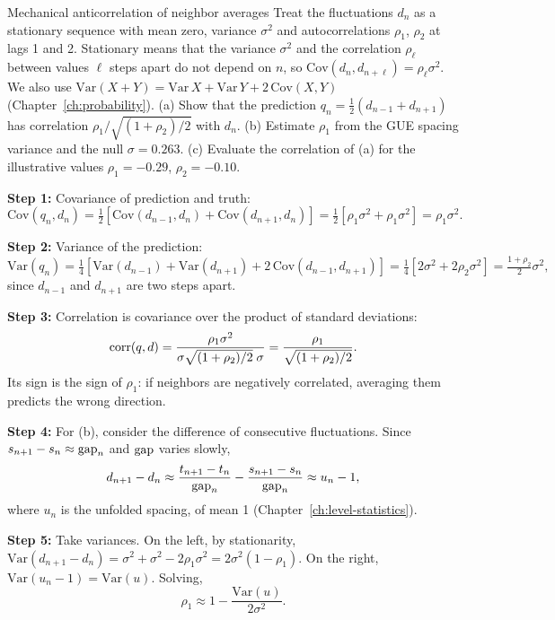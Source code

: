 \begin{sample}{Mechanical anticorrelation of neighbor averages}
Treat the fluctuations $d_n$ as a stationary sequence with mean zero, variance $\sigma^2$ and autocorrelations $\rho_1$, $\rho_2$ at lags 1 and 2. Stationary means that the variance $\sigma^2$ and the correlation $\rho_\ell$ between values $\ell$ steps apart do not depend on $n$, so $\mathrm{Cov}(d_n,d_{n+\ell})=\rho_\ell\sigma^2$. We also use $\mathrm{Var}(X+Y)=\mathrm{Var}\,X+\mathrm{Var}\,Y+2\,\mathrm{Cov}(X,Y)$ (Chapter~\ref{ch:probability}). (a) Show that the prediction $q_n=\tfrac12(d_{n-1}+d_{n+1})$ has correlation $\rho_1/\sqrt{(1+\rho_2)/2}$ with $d_n$. (b) Estimate $\rho_1$ from the GUE spacing variance and the null $\sigma=0.263$. (c) Evaluate the correlation of (a) for the illustrative values $\rho_1=-0.29$, $\rho_2=-0.10$.

\textbf{Step 1:} Covariance of prediction and truth:
\[
\mathrm{Cov}(q_n,d_n)=\tfrac12\left[\mathrm{Cov}(d_{n-1},d_n)+\mathrm{Cov}(d_{n+1},d_n)\right]=\tfrac12[\rho_1\sigma^2+\rho_1\sigma^2]=\rho_1\sigma^2 .
\]

\textbf{Step 2:} Variance of the prediction:
\[
\mathrm{Var}(q_n)=\tfrac14\left[\mathrm{Var}(d_{n-1})+\mathrm{Var}(d_{n+1})+2\,\mathrm{Cov}(d_{n-1},d_{n+1})\right]=\tfrac14[2\sigma^2+2\rho_2\sigma^2]=\tfrac{1+\rho_2}{2}\sigma^2,
\]
since $d_{n-1}$ and $d_{n+1}$ are two steps apart.

\textbf{Step 3:} Correlation is covariance over the product of standard deviations:
\begin{equation}
\mathrm{corr}(q,d)=\frac{\rho_1\sigma^2}{\sigma\sqrt{(1+\rho_2)/2}\;\sigma}=\frac{\rho_1}{\sqrt{(1+\rho_2)/2}} .
\label{eq:paper-memorization-nbrcorr}
\end{equation}
Its sign is the sign of $\rho_1$: if neighbors are negatively correlated, averaging them predicts the wrong direction.

\textbf{Step 4:} For (b), consider the difference of consecutive fluctuations. Since $s_{n+1}-s_n\approx\mathrm{gap}_n$ and $\mathrm{gap}$ varies slowly,
\[
d_{n+1}-d_n\approx\frac{t_{n+1}-t_n}{\mathrm{gap}_n}-\frac{s_{n+1}-s_n}{\mathrm{gap}_n}\approx u_n-1,
\]
where $u_n$ is the unfolded spacing, of mean 1 (Chapter~\ref{ch:level-statistics}).

\textbf{Step 5:} Take variances. On the left, by stationarity, $\mathrm{Var}(d_{n+1}-d_n)=\sigma^2+\sigma^2-2\rho_1\sigma^2=2\sigma^2(1-\rho_1)$. On the right, $\mathrm{Var}(u_n-1)=\mathrm{Var}(u)$. Solving,
\begin{equation}
\rho_1\approx1-\frac{\mathrm{Var}(u)}{2\sigma^2}.
\label{eq:paper-memorization-rho1}
\end{equation}


\end{sample}
